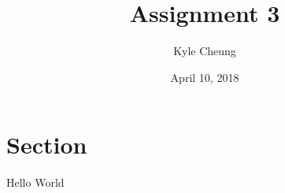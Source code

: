 \documentclass[10pt]{article}
\title{Assignment 3}
\date{April 10, 2018}
\author{Kyle Cheung}
\begin{document}
\maketitle
{}
\newpage
{}

\section{Section}

Hello World
\end{document}
